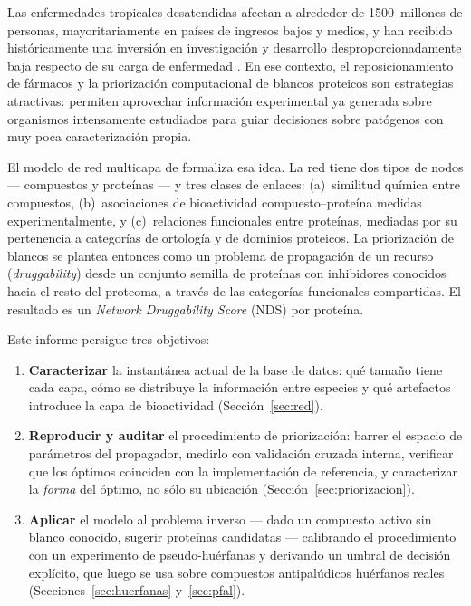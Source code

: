 \documentclass[11pt,a4paper]{article}
\begin{document}
Las enfermedades tropicales desatendidas afectan a alrededor de 1500~millones de
personas, mayoritariamente en países de ingresos bajos y medios, y han recibido
históricamente una inversión en investigación y desarrollo desproporcionadamente
baja respecto de su carga de enfermedad \citep{tdrtargets6}. En ese contexto, el
reposicionamiento de fármacos y la priorización computacional de blancos
proteicos son estrategias atractivas: permiten aprovechar información
experimental ya generada sobre organismos intensamente estudiados para guiar
decisiones sobre patógenos con muy poca caracterización propia.

El modelo de red multicapa de \citet{berenstein2016} formaliza esa idea. La red
tiene dos tipos de nodos --- compuestos y proteínas --- y tres clases de
enlaces: (a)~similitud química entre compuestos, (b)~asociaciones de
bioactividad compuesto--proteína medidas experimentalmente, y (c)~relaciones
funcionales entre proteínas, mediadas por su pertenencia a categorías de
ortología y de dominios proteicos. La priorización de blancos se plantea
entonces como un problema de propagación de un recurso (\emph{druggability})
desde un conjunto semilla de proteínas con inhibidores conocidos hacia el resto
del proteoma, a través de las categorías funcionales compartidas. El resultado
es un \emph{Network Druggability Score} (NDS) por proteína.

Este informe persigue tres objetivos:

\begin{enumerate}
  \item \textbf{Caracterizar} la instantánea actual de la base de datos: qué
    tamaño tiene cada capa, cómo se distribuye la información entre especies y
    qué artefactos introduce la capa de bioactividad
    (Sección~\ref{sec:red}).
  \item \textbf{Reproducir y auditar} el procedimiento de priorización: barrer
    el espacio de parámetros del propagador, medirlo con validación cruzada
    interna, verificar que los óptimos coinciden con la implementación de
    referencia, y caracterizar la \emph{forma} del óptimo, no sólo su ubicación
    (Sección~\ref{sec:priorizacion}).
  \item \textbf{Aplicar} el modelo al problema inverso --- dado un compuesto
    activo sin blanco conocido, sugerir proteínas candidatas --- calibrando el
    procedimiento con un experimento de pseudo-huérfanas y derivando un umbral
    de decisión explícito, que luego se usa sobre compuestos antipalúdicos
    huérfanos reales (Secciones~\ref{sec:huerfanas} y~\ref{sec:pfal}).
\end{enumerate}
\end{document}
